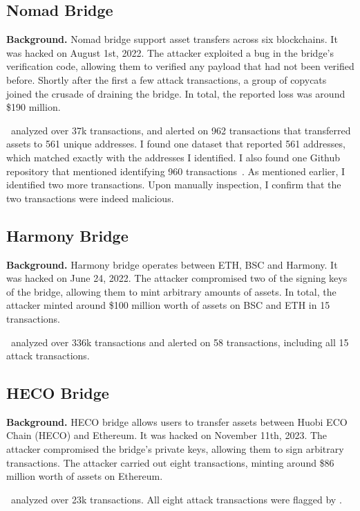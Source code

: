 \subsection{Nomad Bridge}
\textbf{Background.} Nomad bridge support asset transfers across six blockchains. It was hacked on August 1st, 2022. The attacker exploited a bug in the bridge's verification code, allowing them to verified any payload that had not been verified before. Shortly after the first a few attack transactions, a group of copycats joined the crusade of draining the bridge. In total, the reported loss was around \$190 million.

 \offlinetool~analyzed over 37k transactions, and alerted on 962 transactions that transferred assets to 561 unique addresses. I found one dataset that reported 561 addresses, which matched exactly with the addresses I identified. I also found one Github repository that mentioned identifying 960 transactions~\cite{nomad-groundtruth-github:online}. As mentioned earlier, I identified two more transactions. Upon manually inspection, I confirm that the two transactions were indeed malicious.

\subsection{Harmony Bridge}
\textbf{Background.} Harmony bridge operates between ETH, BSC and Harmony. It was hacked on June 24, 2022. The attacker compromised two of the signing keys of the bridge, allowing them to mint arbitrary amounts of assets. In total, the attacker minted around \$100 million worth of assets on BSC and ETH in 15 transactions.

 \offlinetool~analyzed over 336k transactions and alerted on 58 transactions, including all 15 attack transactions. 


\subsection{HECO Bridge}
\textbf{Background.} HECO bridge allows users to transfer assets between Huobi ECO Chain (HECO) and Ethereum. It was hacked on November 11th, 2023. The attacker compromised the bridge's private keys, allowing them to sign arbitrary transactions. The attacker carried out eight transactions, minting around \$86 million worth of assets on Ethereum.

 \offlinetool~analyzed over 23k transactions. All eight attack transactions were flagged by \offlinetool.

